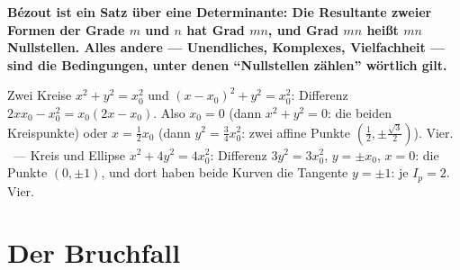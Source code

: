 \begin{merksatz}
\begin{center}
\begin{minipage}{0.9\textwidth}
\textbf{Bézout ist ein Satz über eine Determinante: Die Resultante zweier Formen der Grade $m$ und $n$ hat Grad $mn$, und Grad $mn$ heißt $mn$ Nullstellen. Alles andere --- Unendliches, Komplexes, Vielfachheit --- sind die Bedingungen, unter denen \enquote{Nullstellen zählen} wörtlich gilt.}
\end{minipage}
\end{center}

Zwei Kreise $x^{2} + y^{2} = x_0^{2}$ und $(x - x_0)^{2} + y^{2} = x_0^{2}$: Differenz $2xx_0 - x_0^{2} = x_0(2x - x_0)$. Also $x_0 = 0$ (dann $x^{2} + y^{2} = 0$: die beiden Kreispunkte) oder $x = \tfrac12x_0$ (dann $y^{2} = \tfrac34x_0^{2}$: zwei affine Punkte $(\tfrac12, \pm\tfrac{\sqrt3}{2})$). Vier. \checkmark\ --- Kreis und Ellipse $x^{2} + 4y^{2} = 4x_0^{2}$: Differenz $3y^{2} = 3x_0^{2}$, $y = \pm x_0$, $x = 0$: die Punkte $(0, \pm1)$, und dort haben beide Kurven die Tangente $y = \pm1$: je $I_p = 2$. Vier. \checkmark

\begin{center}
\begin{minipage}{0.88\textwidth}
\end{minipage}
\end{center}
\end{merksatz}

\section{Der Bruchfall}


